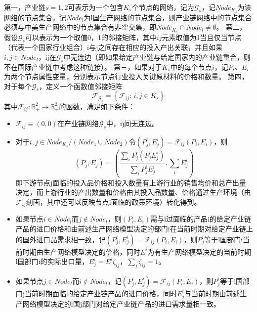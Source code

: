 \documentclass{article}
\begin{document}
第一，产业链$s=1,2$可表示为一个包含$K_s$个节点的网络，记为$\mathcal{G}_s$，记$Node_{K_s}$为该网络的节点集合，记$Node_l$为l国生产网络的节点集合，则产业链网络中的节点集合必须与中美生产网络中的节点集合有非空交集，即$Node_{K_s}\cap Node_l\not=\emptyset$。
第二，假设$\mathcal{G}_s$可以表示为一个取值{0，1}的邻接矩阵，其中$ij$元素取值为1当且仅当节点（代表一个国家行业组合）i与j之间存在相应的投入产出关联，并且如果$i,j\in Node_l$，ij在$\mathcal{G}_s$中无连边（即如果给定产业链与给定国家内的产业链重合，则不在国际产业链中考虑这种链接）。
第三，如果对于$K_s$中的每个节点$i$，记$P_i$、$E_i$为两个节点属性变量，分别表示节点行业投入关键原材料的价格和数量。
第四，对于每个$\mathcal{G}_s$，定义一个函数值邻接矩阵
\begin{equation}
    \mathcal{F}_{\mathcal{G}_s}=\left\{\mathcal{F}_{ij}:\,i,j\in K_s\right\}
\end{equation} 其中$\mathcal{F}_{ij}:\mathbb{R}_+^2\rightarrow \mathbb{R}_+^2$的函数，满足如下条件：
\begin{itemize}
    \item $\mathcal{F}_{ij}\equiv(0,0)$在产业链网络$\mathcal{G}_s$中，ij间无连边。
    \item 对于$i,j\in Node_{K_s}/(Node_{1}\cup Node_2)$令$(P_j^i,E_j^i)=\mathcal{F}_{ij}(P_i,E_i)$，则
    $$(P_j,E_j)=\left(\frac{\sum_i P_j^i( P_j^iE_j^i)}{\sum_iP_j^iE_j^i},\sum_{i}E_j^i\right)$$
    即下游节点j面临的投入品价格和投入数量有上游行业的销售均价和总产出量决定，而上游行业的产出数量和价格由其投入品数量、价格通过生产环境（由$\mathcal{F}_{ij}$刻画，其中还可以反映节点i面临的政策环境）转化得到。
    \item 如果节点$i\in Node_l$而$j\not\in Node_l$，则$(P_i,E_i)$需与l过面临的产品i的给定产业链产品的进口价格和由前述生产网络模型决定的部门i在当前时期对给定产业链上的国外进口品需求相一致，记$(P_j^i,E_j^i)=\mathcal{F}_{ij}(P_i,E_i)$，则$P_j^i$等于l国部门i当前时期由生产网络模型决定的价格，同时$E^i$为有生产网络模型决定的当前时期l国部门i的实际出口量，$E_j^i=E^i \zeta_{ij}$，$\sum_j\zeta_{ij}=1$。
    \item 如果节点$j\in Node_l$而$i\not\in Node_l$，记$(P_j^i,E_j^i)=\mathcal{F}_{ij}(P_i,E_i)$，则$P_j^i$等于l国部门j当前时期面临的给定产业链产品的进口价格，同时$E_j^i$与当前时期由前述生产网络模型决定的l国j部门对给定产业链产品的进口需求量相一致。
\end{itemize}
\end{document}
